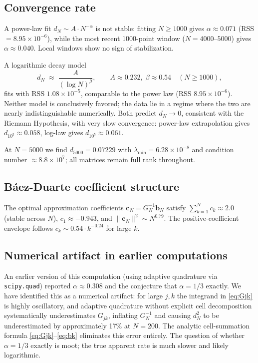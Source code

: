 \documentclass[11pt]{article}
\begin{document}
\subsection{Convergence rate}

A power-law fit $d_N \sim A\cdot N^{-\alpha}$ is not stable: fitting
$N \ge 1000$ gives $\alpha \approx 0.071$ (RSS $= 8.95\times10^{-6}$), while the
most recent 1000-point window ($N = 4000$--$5000$) gives $\alpha \approx 0.040$.
Local windows show no sign of stabilization.

A logarithmic decay model
\begin{equation}
  d_N \;\approx\; \frac{A}{(\log N)^\beta}, \qquad A \approx 0.232,\; \beta \approx 0.54
  \quad (N \ge 1000),
  \label{eq:loglaw}
\end{equation}
fits with RSS $1.08\times10^{-5}$, comparable to the power law (RSS $8.95\times10^{-6}$).
Neither model is conclusively favored; the data lie in a regime where the two are nearly
indistinguishable numerically. Both predict $d_N \to 0$, consistent with the Riemann
Hypothesis, with very slow convergence:
power-law extrapolation gives $d_{10^5} \approx 0.058$, log-law gives $d_{10^5} \approx 0.061$.

At $N = 5000$ we find $d_{5000} = 0.07229$ with $\lambda_{\min} = 6.28\times10^{-8}$
and condition number $\approx 8.8\times10^7$; all matrices remain full rank throughout.

\subsection{Báez-Duarte coefficient structure}

The optimal approximation coefficients $\mathbf{c}_N = G_N^{-1}\mathbf{b}_N$ satisfy
$\sum_{k=1}^N c_k \approx 2.0$ (stable across $N$), $c_1 \approx -0.943$,
and $\|\mathbf{c}_N\|^2 \sim N^{0.79}$.
The positive-coefficient envelope follows $c_k \sim 0.54\cdot k^{-0.24}$ for large $k$.

\subsection{Numerical artifact in earlier computations}

An earlier version of this computation (using adaptive quadrature via \texttt{scipy.quad})
reported $\alpha \approx 0.308$ and the conjecture that $\alpha = 1/3$ exactly.
We have identified this as a numerical artifact: for large $j, k$ the integrand in
\eqref{eq:Gjk} is highly oscillatory, and adaptive quadrature without explicit cell
decomposition systematically underestimates $G_{jk}$, inflating $G_N^{-1}$ and causing
$d_N^2$ to be underestimated by approximately 17\% at $N = 200$.
The analytic cell-summation formula \eqref{eq:Gjk}--\eqref{eq:bk} eliminates this error
entirely. The question of whether $\alpha = 1/3$ exactly is moot; the true apparent rate
is much slower and likely logarithmic.
\end{document}
